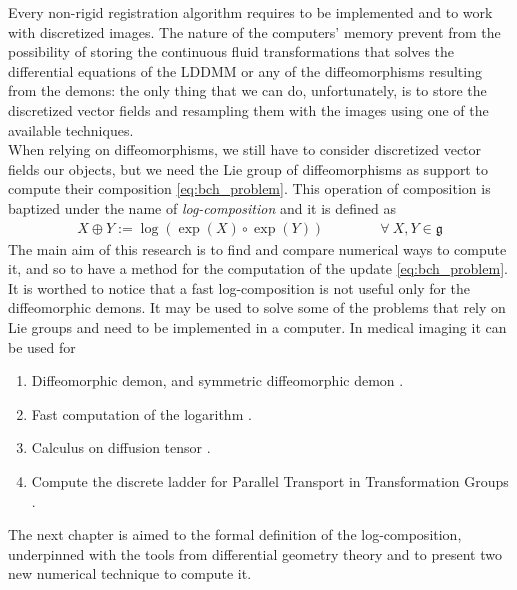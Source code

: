 Every non-rigid registration algorithm requires to be implemented and to work with discretized images.
The nature of the computers' memory prevent from the possibility of storing the continuous fluid transformations that solves the differential equations of the LDDMM or any of the diffeomorphisms resulting from the demons: the only thing that we can do, unfortunately, is to store the discretized vector fields and resampling them with the images using one of the available techniques.\\
When relying on diffeomorphisms, we still have to consider discretized vector fields our objects, but we need the Lie group of diffeomorphisms as support to compute their composition \ref{eq:bch_problem}.
This operation of composition is baptized under the name of \emph{log-composition} and it is defined as
\begin{align*}
X \oplus Y := \log(\exp(X)\circ\exp( Y))
\qquad \qquad
\forall ~X, Y \in \mathfrak{g}
\end{align*}
The main aim of this research is to find and compare numerical ways to compute it, and so to have a method for the computation of the update \ref{eq:bch_problem}. \\

It is worthed to notice that a fast log-composition is not useful only for the diffeomorphic demons. It may be used to solve some of the problems that rely on Lie groups and need to be implemented in a computer. In medical imaging it can be used for
\begin{enumerate}
	\item Diffeomorphic demon, and symmetric diffeomorphic demon \cite{vercauteren2006robust, vercauteren08}.
	\item Fast computation of the logarithm \cite{Bossa:08}.
	\item Calculus on diffusion tensor \cite{Arsigny:MRM:06}. 
	\item Compute the discrete ladder for Parallel Transport in Transformation Groups \cite{Lorenzi:discrete_ladders:14}.
\end{enumerate}	
	
The next chapter is aimed to the formal definition of the log-composition, underpinned with the tools from differential geometry theory and to present two new numerical technique to compute it.







